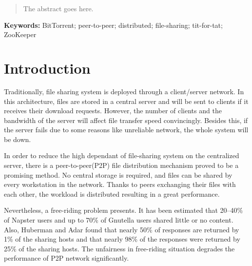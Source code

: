 \documentclass[conference]{IEEEtran}
\begin{document}
	
	
	
	
	
	
	
	\maketitle
	
	\begin{abstract}
		The abstract goes here.
	\end{abstract}
	
	{\bf Keywords:} BitTorrent; peer-to-peer; distributed; file-sharing; tit-for-tat; ZooKeeper

	
	
	
	
	\IEEEpeerreviewmaketitle
	
	
	
	\section{Introduction}
	Traditionally, file sharing system is deployed through a client/server network. In this architecture, files are stored in a central server and will be sent to clients if it receives their download requests. However, the number of clients and the bandwidth of the server will affect file transfer speed convincingly. Besides this, if the server fails due to some reasons like unreliable network, the whole system will be down. 
	
	In order to reduce the high dependant of file-sharing system on the centralized server, there is a peer-to-peer(P2P) file distribution mechanism proved to be a promising method. No central storage is required, and files can be shared by every workstation in the network. Thanks to peers exchanging their files with each other, the workload is distributed resulting in a great performance.
	
	Nevertheless, a free-riding problem presents. It has been estimated\cite{Measurement} that 20–40\% of Napster users and up to 70\% of Gnutella users shared little or no content. Also, Huberman and Adar\cite{Gnutella} found that nearly 50\% of responses are returned by 1\% of the sharing hosts and that nearly 98\% of the responses were returned by 25\% of the sharing hosts. The unfairness in free-riding situation degrades the performance of P2P network significantly. 
\end{document}
